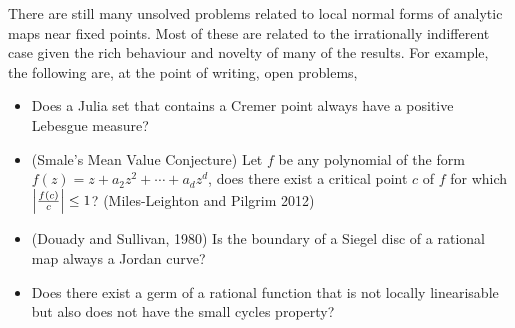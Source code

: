 \documentclass[../main.tex]{subfiles}
\begin{document}
There are still many unsolved problems related to local normal forms of analytic maps near fixed points. Most of these are related to the irrationally indifferent case given the rich behaviour and novelty of many of the results. For example, the following are, at the point of writing, open problems,
\begin{itemize}
    \item Does a Julia set that contains a Cremer point always have a positive Lebesgue measure? 
    
    \item (Smale’s Mean Value Conjecture)
    Let $f$ be any polynomial of the form $f(z)=z+a_{2} z^{2}+\cdots+a_{d} z^{d}$, does there exist a critical point $c$ of $f$ for which $\left|\frac{f(c)}{c}\right| \leq 1$? (Miles-Leighton and Pilgrim 2012)

    \item (Douady and Sullivan, 1980) Is the boundary of a Siegel disc of a rational map always a Jordan curve? 
    
    \item Does there exist a germ of a rational function that is not locally linearisable but also does not have the small cycles property?
\end{itemize}

%
\end{document}
